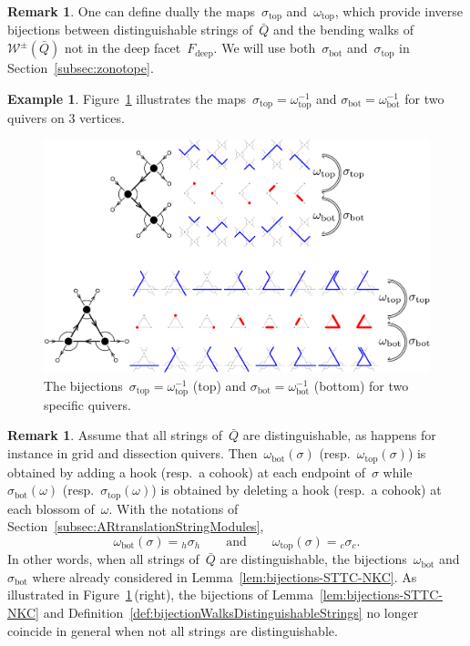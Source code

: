 \documentclass{memo-l}
\theoremstyle{definition}
\newtheorem{example}[theorem]{Example}
\newtheorem{remark}[theorem]{Remark}
\newcommand{\fref}[1]{Figure~\ref{#1}} %
\newcommand{\walks}{\mathcal{W}} %
\newcommand{\deep}{\mathrm{deep}} %
\renewcommand{\top}{\mathrm{top}} %
\newcommand{\bottom}{\mathrm{bot}} %
\begin{document}
\begin{remark}
\label{rem:bijectionDistinguishableStringsWalks}
One can define dually the maps~$\sigma_\top$ and~$\omega_\top$, which provide inverse bijections between distinguishable strings of~$\bar Q$ and the bending walks of~$\walks^\pm(\bar Q)$ not in the deep facet~$F_\deep$.
We will use both~$\sigma_\bottom$ and~$\sigma_\top$ in Section~\ref{subsec:zonotope}.
\end{remark}

\begin{example}
\fref{fig:exmBijectionStringsWalks2} illustrates the maps~$\sigma_\top = \omega_\top^{-1}$ and $\sigma_\bottom = \omega_\bottom^{-1}$ for two quivers on $3$ vertices.

\begin{figure}[t]
	\capstart
	\centerline{\includegraphics[scale=.5]{exmBijectionStringsWalks2}}
	\caption{The bijections~$\sigma_\top = \omega_\top^{-1}$ (top) and $\sigma_\bottom = \omega_\bottom^{-1}$ (bottom) for two specific quivers.}
	\label{fig:exmBijectionStringsWalks2}
\end{figure}
\end{example}

\begin{remark}
Assume that all strings of~$\bar Q$ are distinguishable, as happens for instance in grid and dissection quivers.
Then~$\omega_\bottom(\sigma)$ (resp.~$\omega_\top(\sigma)$) is obtained by adding a hook (resp.~a cohook) at each endpoint of~$\sigma$ while $\sigma_\bottom(\omega)$ (resp.~$\sigma_\top(\omega)$) is obtained by deleting a hook (resp.~a cohook) at each blossom of~$\omega$.
With the notations of Section~\ref{subsec:ARtranslationStringModules},
\[
\omega_\bottom(\sigma) = {}_h\sigma_h
\qquad\text{and}\qquad
\omega_\top(\sigma) = {}_c\sigma_c.
\]
In other words, when all strings of~$\bar Q$ are distinguishable, the bijections~$\omega_\bottom$ and~$\sigma_\bottom$ where already considered in Lemma~\ref{lem:bijections-STTC-NKC}.
As illustrated in \fref{fig:exmBijectionStringsWalks2}\,(right), the bijections of Lemma~\ref{lem:bijections-STTC-NKC} and Definition~\ref{def:bijectionWalksDistinguishableStrings} no longer coincide in general when not all strings are distinguishable.
\end{remark}
\end{document}
